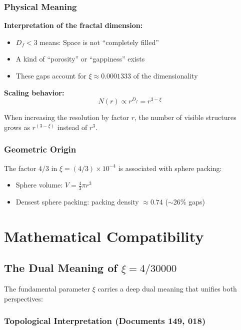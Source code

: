 	\subsubsection{Physical Meaning}
	
	\textbf{Interpretation of the fractal dimension:}
	\begin{itemize}
		\item $D_f < 3$ means: Space is not \enquote{completely filled}
		\item A kind of \enquote{porosity} or \enquote{gappiness} exists
		\item These gaps account for $\xi \approx 0.0001333$ of the dimensionality
	\end{itemize}
	
	\textbf{Scaling behavior:}
	\begin{equation}
		N(r) \propto r^{D_f} = r^{3-\xi}
	\end{equation}
	
	When increasing the resolution by factor $r$, the number of visible structures grows as $r^{(3-\xi)}$ instead of $r^3$.
	
	\subsubsection{Geometric Origin}
	
	The factor $4/3$ in $\xi = (4/3) \times 10^{-4}$ is associated with sphere packing:
	\begin{itemize}
		\item Sphere volume: $V = \frac{4}{3}\pi r^3$
		\item Densest sphere packing: packing density $\approx 0.74$ ($\sim$26\% gaps)
	\end{itemize}
	
	\section{Mathematical Compatibility}
	
	\subsection{The Dual Meaning of $\xi = 4/30000$}
	
	The fundamental parameter $\xi$ carries a deep dual meaning that unifies both perspectives:
	
	\subsubsection{Topological Interpretation (Documents 149, 018)}
	
